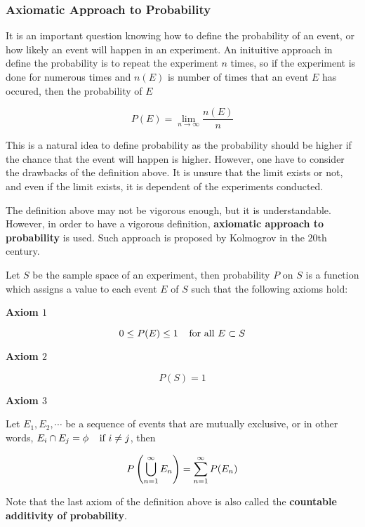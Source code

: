 \documentclass[a4paper,12pt]{article}
\begin{document}
\subsubsection{Axiomatic Approach to Probability}
It is an important question knowing how to define the probability of an event, or how likely an event will happen in an experiment. An inituitive approach in define the probability is to repeat the experiment $n$ times, so if the experiment is done for numerous times and $n(E)$ is number of times that an event $E$ has occured, then the probability of $E$

$$P(E)=\lim_{n\to\infty}\frac{n(E)}{n}$$\s

This is a natural idea to define probability as the probability should be higher if the chance that the event will happen is higher. However, one have to consider the drawbacks of the definition above. It is unsure that the limit exists or not, and even if the limit exists, it is dependent of the experiments conducted.\n

The definition above may not be vigorous enough, but it is understandable. However, in order to have a vigorous definition, \textbf{axiomatic approach to probability} is used. Such approach is proposed by Kolmogrov in the $20$th century.\n

\begin{dft}
  Let $S$ be the sample space of an experiment, then probability $P$ on $S$ is a function which assigns a value to each event $E$ of $S$ such that the following axioms hold:

  \begin{alist}
    \item\textbf{Axiom $1$}
    
    $$0\leq P(E)\leq 1\;\;\;\;\text{for all }E\subset S$$

    \item\textbf{Axiom $2$}
    
    $$P(S)=1$$

    \item\textbf{Axiom $3$}\n
    
    Let $E_{1},E_{2},\cdots$ be a sequence of events that are mutually exclusive, or in other words, $E_{i}\cap E_{j}=\phi\;\;\;\;\text{if }i\neq j$, then

    $$P\left( \bigcup_{n=1}^{\infty}E_{n}\right)=\sum_{n=1}^{\infty}P(E_{n})$$
  \end{alist}
\end{dft}\n

Note that the last axiom of the definition above is also called the \textbf{countable additivity of probability}.
\end{document}
